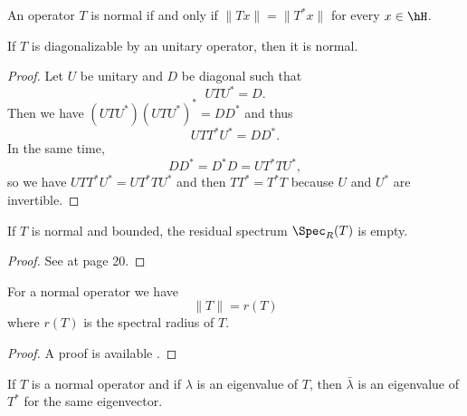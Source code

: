 \begin{proposition}     \label{PropoCartactNormal}
    An operator \( T\) is normal if and only if \( \| Tx \|=\| T^*x \|\) for every \( x\in\hH\).
\end{proposition}

\begin{proposition}
    If \( T\) is diagonalizable by an unitary operator, then it is normal.
\end{proposition}

\begin{proof}
    Let \( U\) be unitary and \( D\) be diagonal such that
    \begin{equation}
        UTU^*=D.
    \end{equation}
    Then we have \( (UTU^*)(UTU^*)^*=DD^*\) and thus
    \begin{equation}
        UTT^*U^*=DD^*.
    \end{equation}
    In the same time,
    \begin{equation}
        DD^*=D^*D=UT^*TU^*,
    \end{equation}
    so we have \( UTT^*U^*=UT^*TU^*\) and then \( TT^*=T^*T\) because \( U\) and \( U^*\) are invertible.
\end{proof}

\begin{proposition}
    If \( T\) is normal and bounded, the residual spectrum \( \Spec_R(T)\) is empty.
\end{proposition}

\begin{proof}
    See \cite{AndrewGreen} at page 20.
\end{proof}

\begin{proposition}
    For a normal operator we have
    \begin{equation}
        \| T \|=r(T)
    \end{equation}
    where \( r(T)\) is the spectral radius of \( T\). 
\end{proposition}

\begin{proof}
    A proof is available .
\end{proof}

\begin{proposition}
    If \( T\) is a normal operator and if \( \lambda\) is an eigenvalue of \( T\), then \( \bar\lambda\) is an eigenvalue of \( T^*\) for the same eigenvector.
\end{proposition}

